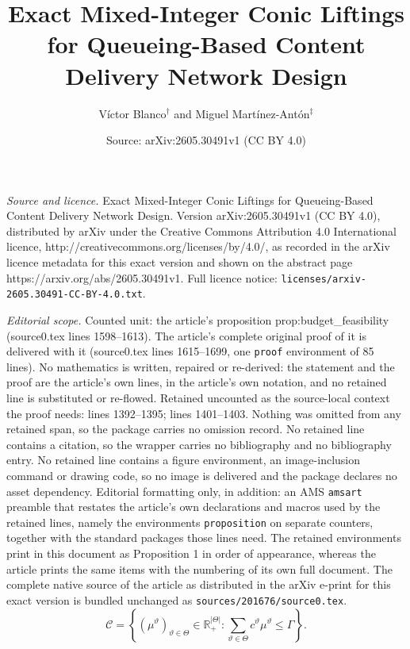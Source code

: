 \documentclass[10pt,a4paper]{amsart}
\title{\Large Exact Mixed-Integer Conic Liftings for Queueing-Based Content Delivery Network Design}
\author{{\large V\'ictor Blanco$^{\dagger}$ and Miguel Mart\'inez-Ant\'on$^{\ddagger}$}\bigskip}
\date{Source: arXiv:2605.30491v1 (CC BY 4.0)}
\newcommand{\R}{\mathbb{R}}
\begin{document}
\maketitle

\noindent\emph{Source and licence.} \Large Exact Mixed-Integer Conic Liftings for Queueing-Based Content Delivery Network Design. Version arXiv:2605.30491v1 (CC BY 4.0), distributed by arXiv under the Creative Commons Attribution 4.0 International licence, http://creativecommons.org/licenses/by/4.0/, as recorded in the arXiv licence metadata for this exact version and shown on the abstract page https://arxiv.org/abs/2605.30491v1. Full licence notice: \texttt{licenses/arxiv-2605.30491-CC-BY-4.0.txt}.\par\smallskip

\noindent\textit{Editorial scope.} Counted unit: the article's proposition prop:budget\_feasibility (source0.tex lines 1598--1613). The article's complete original proof of it is delivered with it (source0.tex lines 1615--1699, one \texttt{proof} environment of 85 lines). No mathematics is written, repaired or re-derived: the statement and the proof are the article's own lines, in the article's own notation, and no retained line is substituted or re-flowed.  Retained uncounted as the source-local context the proof needs: lines 1392--1395; lines 1401--1403.  Nothing was omitted from any retained span, so the package carries no omission record.  No retained line contains a citation, so the wrapper carries no bibliography and no bibliography entry.  No retained line contains a figure environment, an image-inclusion command or drawing code, so no image is delivered and the package declares no asset dependency.  Editorial formatting only, in addition: an AMS \texttt{amsart} preamble that restates the article's own declarations and macros used by the retained lines, namely the environments \texttt{proposition} on separate counters, together with the standard packages those lines need.  The retained environments print in this document as Proposition 1 in order of appearance, whereas the article prints the same items with the numbering of its own full document.  The complete native source of the article as distributed in the arXiv e-print for this exact version is bundled unchanged as \texttt{sources/201676/source0.tex}.
\begin{equation}
\mathcal{C} = \left\{ (\mu^\vartheta)_{\vartheta\in \Theta} \in \R^{|\Theta|}_+ : \sum_{\vartheta \in \Theta} c^\vartheta \mu^\vartheta \le \Gamma \right\}.
\label{budget}\tag{Budget}
\end{equation}
\end{document}
